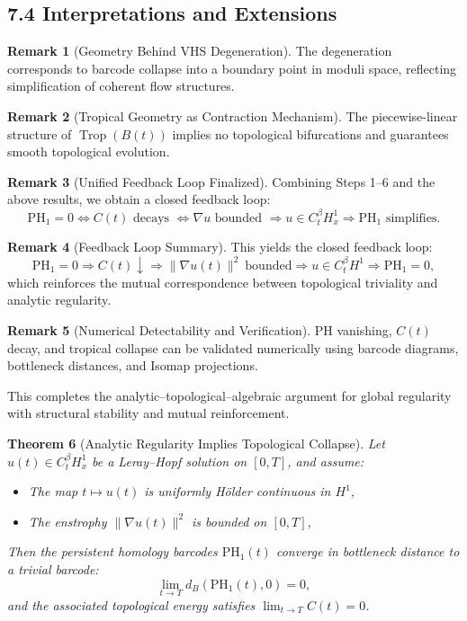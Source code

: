 \documentclass[11pt]{article}
\newtheorem{theorem}{Theorem}[section]
\theoremstyle{definition}
\newtheorem{remark}[theorem]{Remark}
\begin{document}
\subsection*{7.4 Interpretations and Extensions}

\begin{remark}[Geometry Behind VHS Degeneration]
The degeneration corresponds to barcode collapse into a boundary point in moduli space, reflecting simplification of coherent flow structures.
\end{remark}

\begin{remark}[Tropical Geometry as Contraction Mechanism]
The piecewise-linear structure of $\operatorname{Trop}(B(t))$ implies no topological bifurcations and guarantees smooth topological evolution.
\end{remark}

\begin{remark}[Unified Feedback Loop Finalized]
Combining Steps 1--6 and the above results, we obtain a closed feedback loop:
\[\mathrm{PH}_1 = 0 \Leftrightarrow C(t) \text{ decays } \Leftrightarrow \nabla u \text{ bounded } \Rightarrow u \in C^{\beta}_t H^1_x \Rightarrow \mathrm{PH}_1 \text{ simplifies}.\]
\end{remark}

\begin{remark}[Feedback Loop Summary]
This yields the closed feedback loop:
\[
\text{PH}_1 = 0 \Longrightarrow C(t)\downarrow \Longrightarrow \|\nabla u(t)\|^2\ \text{bounded} \Longrightarrow u \in C_t^\beta H^1 \Longrightarrow \text{PH}_1 = 0,
\]
which reinforces the mutual correspondence between topological triviality and analytic regularity.
\end{remark}

\begin{remark}[Numerical Detectability and Verification]
PH vanishing, $C(t)$ decay, and tropical collapse can be validated numerically using barcode diagrams, bottleneck distances, and Isomap projections.
\end{remark}

This completes the analytic–topological–algebraic argument for global regularity with structural stability and mutual reinforcement.

\begin{theorem}[Analytic Regularity Implies Topological Collapse]
Let \( u(t) \in C^\beta_t H^1_x \) be a Leray--Hopf solution on \( [0, T] \), and assume:
\begin{itemize}
  \item The map \( t \mapsto u(t) \) is uniformly Hölder continuous in \( H^1 \),
  \item The enstrophy \( \|\nabla u(t)\|^2 \) is bounded on \( [0, T] \),
\end{itemize}
Then the persistent homology barcodes \( \mathrm{PH}_1(t) \) converge in bottleneck distance to a trivial barcode:
\[\lim_{t \to T} d_B(\mathrm{PH}_1(t), 0) = 0,\]
and the associated topological energy satisfies \( \lim_{t \to T} C(t) = 0 \).
\end{theorem}
\end{document}
